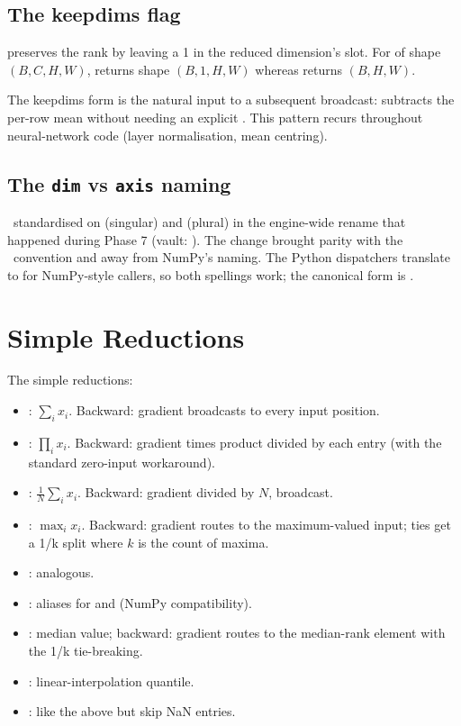 \subsection{The keepdims flag}
\label{ssec:reductions:keepdims}

 preserves the rank by leaving a 1 in the
reduced dimension's slot. For  of shape \((B, C, H, W)\),
 returns shape \((B, 1, H, W)\)
whereas  returns \((B, H, W)\).

The keepdims form is the natural input to a subsequent broadcast:
 subtracts the per-row
mean without needing an explicit . This pattern
recurs throughout neural-network code (layer normalisation, mean
centring).

\subsection{The \texttt{dim} vs \texttt{axis} naming}
\label{ssec:reductions:dim_axis}

\Lucid\ standardised on  (singular) and 
(plural) in the engine-wide rename that happened during Phase 7
(vault: ). The change brought parity
with the \ convention and away from NumPy's 
naming. The Python dispatchers translate  to
 for NumPy-style callers, so both spellings work; the
canonical form is .

\section{Simple Reductions}
\label{sec:reductions:simple}

The simple reductions:

\begin{itemize}
  \item {}: \(\sum_i x_i\). Backward: gradient
    broadcasts to every input position.
  \item {}: \(\prod_i x_i\). Backward: gradient times
    product divided by each entry (with the standard zero-input
    workaround).
  \item {}: \(\frac{1}{N}\sum_i x_i\). Backward:
    gradient divided by \(N\), broadcast.
  \item {}: \(\max_i x_i\). Backward: gradient routes
    to the maximum-valued input; ties get a 1/k split where \(k\)
    is the count of maxima.
  \item {}: analogous.
  \item {}: aliases for  and
     (NumPy compatibility).
  \item {}: median value; backward: gradient routes
    to the median-rank element with the 1/k tie-breaking.
  \item {}: linear-interpolation quantile.
  \item {}: like the
    above but skip NaN entries.
\end{itemize}

